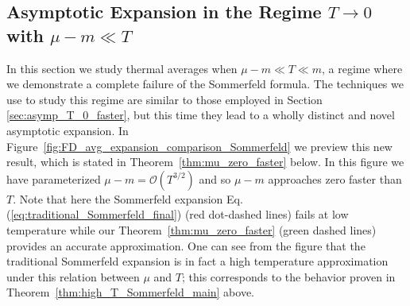 \documentclass[sn-mathphys,Numbered]{sn-jnl}
\newcommand{\req}[1]{Eq.\,(\ref{#1})}
\newcommand{\rf}[1]{Figure~{\ref{#1}}}
\newcommand{\rTh}[1]{Theorem~{\ref{#1}}}
\begin{document}
\subsection{Asymptotic Expansion in the Regime $T\to 0$ with $\mu-m\ll T$}\label{sec:asympt_Delta_mu_order_T}
In this section we study thermal averages when $\mu-m\ll T\ll m$, a regime where we demonstrate a complete failure of the Sommerfeld formula. The techniques we use   to study this regime are similar to those employed in Section \ref{sec:asymp_T_0_faster}, but this time they lead to a wholly distinct and novel asymptotic expansion. In \rf{fig:FD_avg_expansion_comparison_Sommerfeld} we preview this new result, which is stated in \rTh{thm:mu_zero_faster} below. In this figure we have parameterized $\mu-m=\mathcal{O}(T^{3/2})$ and so $\mu-m$ approaches zero faster than $T$. Note that here the Sommerfeld expansion \req{eq:traditional_Sommerfeld_final} (red dot-dashed lines) fails at low temperature while our \rTh{thm:mu_zero_faster} (green dashed lines) provides an accurate approximation. One can see from the figure that the traditional Sommerfeld expansion is in fact a high temperature approximation under this relation between $\mu$ and $T$; this corresponds to the behavior proven in \rTh{thm:high_T_Sommerfeld_main} above.
\end{document}
